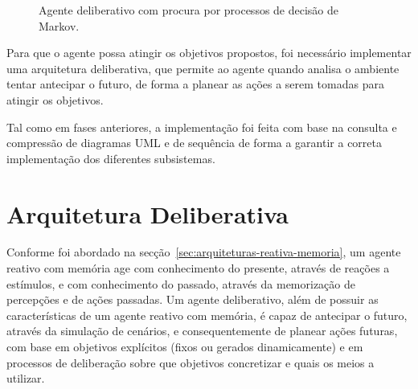\begin{figure}[H]
    \begin{center}
    \end{center}
    \caption{Agente deliberativo com procura por processos de decisão de Markov.}
    \label{fig:agente-delib-pdm}
\end{figure}

Para que o agente possa atingir os objetivos propostos, foi necessário implementar uma arquitetura deliberativa, que permite ao agente quando analisa o ambiente tentar antecipar o futuro, de forma a planear as ações a serem tomadas para atingir os objetivos.

Tal como em fases anteriores, a implementação foi feita com base na consulta e compressão de diagramas UML e de sequência de forma a garantir a correta implementação dos diferentes subsistemas.


\section{Arquitetura Deliberativa}\label{sec:arquitetura-deliberativa}

Conforme foi abordado na secção~\ref{sec:arquiteturas-reativa-memoria}, um agente reativo com memória age com conhecimento do presente, através de reações a estímulos, e com conhecimento do passado, através da memorização de percepções e de ações passadas.
Um agente deliberativo, além de possuir as características de um agente reativo com memória, é capaz de antecipar o futuro, através da simulação de cenários, e consequentemente de planear ações futuras, com base em objetivos explícitos (fixos ou gerados dinamicamente) e em processos de deliberação sobre que objetivos concretizar e quais os meios a utilizar.

